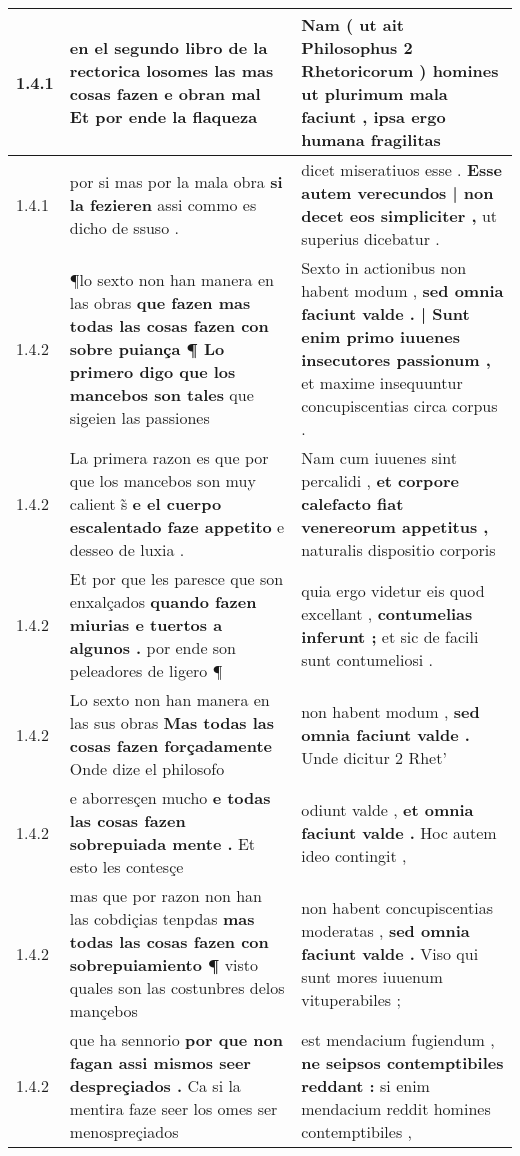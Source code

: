 \begin{tabular}{|p{1cm}|p{6.5cm}|p{6.5cm}|}
1.4.1 & en el segundo libro de la rectorica \textbf{ losomes las mas cosas fazen e obran mal } Et por ende la flaqueza & Nam ( ut ait Philosophus 2 Rhetoricorum ) homines \textbf{ ut plurimum mala faciunt , } ipsa ergo humana fragilitas \\\hline
1.4.1 & por si mas por la mala obra \textbf{ si la fezieren } assi commo es dicho de ssuso . & dicet miseratiuos esse . \textbf{ Esse autem verecundos | non decet eos simpliciter , } ut superius dicebatur . \\\hline
1.4.2 & ¶lo sexto non han manera en las obras \textbf{ que fazen mas todas las cosas fazen con sobre puiança ¶ Lo primero digo que los mancebos son tales } que sigeien las passiones & Sexto in actionibus non habent modum , \textbf{ sed omnia faciunt valde . | Sunt enim primo iuuenes insecutores passionum , } et maxime insequuntur concupiscentias circa corpus . \\\hline
1.4.2 & La primera razon es que por que los mancebos son muy calient s̃ \textbf{ e el cuerpo escalentado faze appetito } e desseo de luxia . & Nam cum iuuenes sint percalidi , \textbf{ et corpore calefacto fiat venereorum appetitus , } naturalis dispositio corporis \\\hline
1.4.2 & Et por que les paresce que son enxalçados \textbf{ quando fazen miurias e tuertos a algunos . } por ende son peleadores de ligero ¶ & quia ergo videtur eis quod excellant , \textbf{ contumelias inferunt ; } et sic de facili sunt contumeliosi . \\\hline
1.4.2 & Lo sexto non han manera en las sus obras \textbf{ Mas todas las cosas fazen forçadamente } Onde dize el philosofo & non habent modum , \textbf{ sed omnia faciunt valde . } Unde dicitur 2 Rhet’ \\\hline
1.4.2 & e aborresçen mucho \textbf{ e todas las cosas fazen sobrepuiada mente . } Et esto les contesçe & odiunt valde , \textbf{ et omnia faciunt valde . } Hoc autem ideo contingit , \\\hline
1.4.2 & mas que por razon non han las cobdiçias tenpdas \textbf{ mas todas las cosas fazen con sobrepuiamiento ¶ } visto quales son las costunbres delos mançebos & non habent concupiscentias moderatas , \textbf{ sed omnia faciunt valde . } Viso qui sunt mores iuuenum vituperabiles ; \\\hline
1.4.2 & que ha sennorio \textbf{ por que non fagan assi mismos seer despreçiados . } Ca si la mentira faze seer los omes ser menospreçiados & est mendacium fugiendum , \textbf{ ne seipsos contemptibiles reddant : } si enim mendacium reddit homines contemptibiles , \\\hline

\end{tabular}

